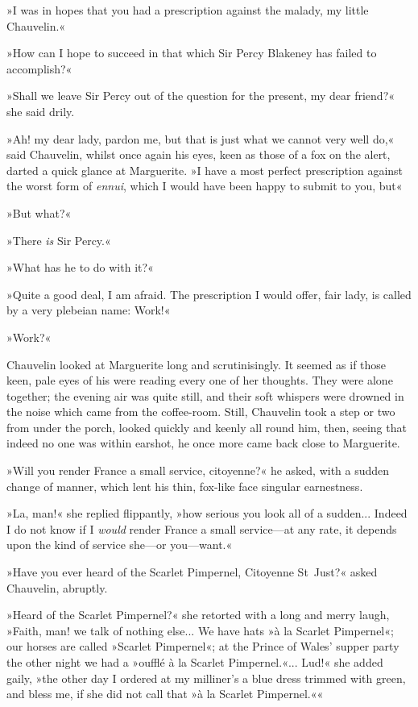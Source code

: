 »I was in hopes that you had a prescription against the malady, my little Chauvelin.«

»How can I hope to succeed in that which Sir Percy Blakeney has failed to accomplish?«

»Shall we leave Sir Percy out of the question for the present, my dear friend?« she said drily.

»Ah! my dear lady, pardon me, but that is just what we cannot very well do,« said Chauvelin, whilst once again his eyes, keen as those of a fox on the alert, darted a quick glance at Marguerite. »I have a most perfect prescription against the worst form of \textit{ennui}, which I would have been happy to submit to you, but\longdash«

»But what?«

»There \textit{is} Sir Percy.«

»What has he to do with it?«

»Quite a good deal, I am afraid. The prescription I would offer, fair lady, is called by a very plebeian name: Work!«

»Work?«

Chauvelin looked at Marguerite long and scrutinisingly. It seemed as if those keen, pale eyes of his were reading every one of her thoughts. They were alone together; the evening air was quite still, and their soft whispers were drowned in the noise which came from the coffee-room. Still, Chauvelin took a step or two from under the porch, looked quickly and keenly all round him, then, seeing that indeed no one was within earshot, he once more came back close to Marguerite.

»Will you render France a small service, citoyenne?« he asked, with a sudden change of manner, which lent his thin, fox-like face singular earnestness.

»La, man!« she replied flippantly, »how serious you look all of a sudden... Indeed I do not know if I \textit{would} render France a small service\allowbreak---\allowbreak at any rate, it depends upon the kind of service she\allowbreak---\allowbreak or you\allowbreak---\allowbreak want.«

»Have you ever heard of the Scarlet Pimpernel, Citoyenne St~Just?« asked Chauvelin, abruptly.

»Heard of the Scarlet Pimpernel?« she retorted with a long and merry laugh, »Faith, man! we talk of nothing else... We have hats »à la Scarlet Pimpernel«; our horses are called »Scarlet Pimpernel«; at the Prince of Wales' supper party the other night we had a »oufflé à la Scarlet Pimpernel.«... Lud!« she added gaily, »the other day I ordered at my milliner's a blue dress trimmed with green, and bless me, if she did not call that »à la Scarlet Pimpernel.««

